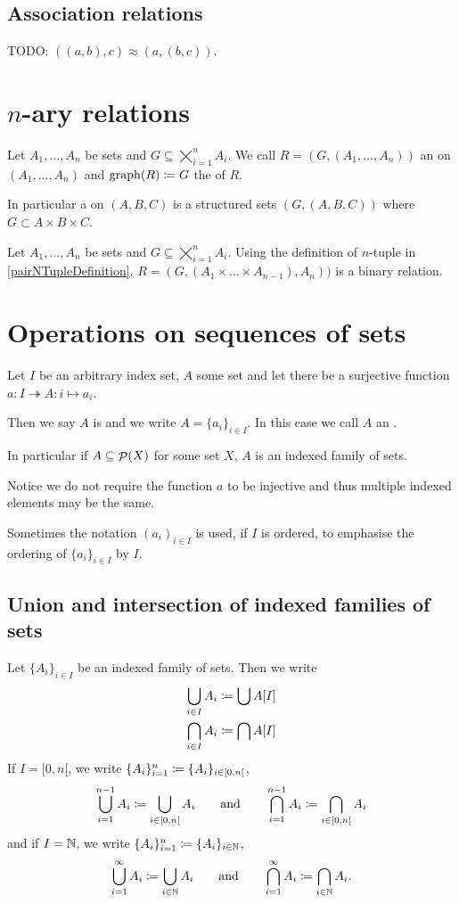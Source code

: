\subsection{Association relations}
TODO: $((a,b),c) \approx (a,(b,c))$.


\section{$n$-ary relations}
\begin{definition}
Let $A_1, \ldots, A_n$ be sets and $G \subseteq \bigtimes_{i=1}^nA_i$. We call $R = (G, (A_1, \ldots, A_n))$ an  on $(A_1, \ldots, A_n)$ and $\operatorname{graph}(R) \coloneqq G$ the  of $R$.
\end{definition}
In particular a  on $(A,B,C)$ is a structured sets $(G,(A,B,C))$ where $G \subset A\times B\times C$.

\begin{proposition}
Let $A_1, \ldots, A_n$ be sets and $G \subseteq \bigtimes_{i=1}^nA_i$. Using the definition of $n$-tuple in \ref{pairNTupleDefinition}, $R = (G, (A_1 \times \ldots \times A_{n-1}), A_n))$ is a binary relation.
\end{proposition}

\section{Operations on sequences of sets}
\begin{definition}
Let $I$ be an arbitrary index set, $A$ some set and let there be a surjective function $a: I\twoheadrightarrow A: i \mapsto a_i$.

Then we say $A$ is  and we write $A = \{a_i\}_{i\in I}$. In this case we call $A$ an .

In particular if $A\subseteq \mathop{\mathcal{P}}(X)$ for some set $X$, $A$ is an indexed family of sets.
\end{definition}
Notice we do not require the function $a$ to be injective and thus multiple indexed elements may be the same.

Sometimes the notation $(a_i)_{i\in I}$ is used, if $I$ is ordered, to emphasise the ordering of $\{a_i\}_{i\in I}$ by $I$.

\subsection{Union and intersection of indexed families of sets}
Let $\{A_i\}_{i\in I}$ be an indexed family of sets. Then we write
\begin{align*}
\bigcup_{i\in I} A_i &\coloneqq \bigcup A[I] \\
\bigcap_{i\in I} A_i &\coloneqq \bigcap A[I]
\end{align*}
If $I = [0,n[$, we write $\{A_i\}_{i=1}^{n} \coloneqq \{A_i\}_{i\in [0,n[}$,
\[ \bigcup_{i=1}^{n-1} A_i \coloneqq \bigcup_{i\in [0,n[} A_i \qquad \text{and} \qquad \bigcap_{i=1}^{n-1} A_i \coloneqq \bigcap_{i\in [0,n[} A_i \]
and if $I=\mathbb{N}$, we write $\{A_i\}_{i=1}^{n} \coloneqq \{A_i\}_{i\in \mathbb{N}}$,
\[ \bigcup_{i=1}^{\infty} A_i \coloneqq \bigcup_{i\in \mathbb{N}} A_i \qquad \text{and} \qquad \bigcap_{i=1}^{\infty} A_i \coloneqq \bigcap_{i\in \mathbb{N}} A_i. \]


